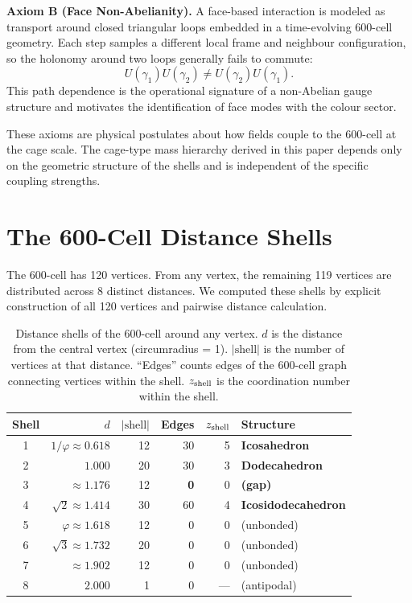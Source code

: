 \documentclass[11pt,letterpaper]{article}
\newcommand{\phig}{\varphi}
\begin{document}
\medskip

\textbf{Axiom B (Face Non-Abelianity).}
A face-based interaction is modeled as transport around closed
triangular loops embedded in a time-evolving 600-cell geometry.
Each step samples a different local frame and neighbour
configuration, so the holonomy around two loops generally fails to
commute:
\begin{equation}
U(\gamma_1)U(\gamma_2)\neq U(\gamma_2)U(\gamma_1).
\end{equation}
This path dependence is the operational signature of a non-Abelian
gauge structure and motivates the identification of face modes with
the colour sector.

\medskip

These axioms are physical postulates about how fields couple to
the 600-cell at the cage scale.  The cage-type mass hierarchy
derived in this paper depends only on the geometric structure of
the shells and is independent of the specific coupling strengths.

\section{The 600-Cell Distance Shells}
\label{sec:shells}

The 600-cell has 120 vertices.  From any vertex, the remaining 119
vertices are distributed across 8 distinct distances.  We computed
these shells by explicit construction of all 120 vertices and
pairwise distance calculation.

\begin{table}[H]
\centering
\caption{Distance shells of the 600-cell around any vertex.
  $d$ is the distance from the central vertex (circumradius = 1).
  $|\text{shell}|$ is the number of vertices at that distance.
  ``Edges'' counts edges of the 600-cell graph connecting
  vertices within the shell.  $z_{\rm shell}$ is the coordination
  number within the shell.}
\label{tab:shells}
\begin{tabular}{@{}crrrrl@{}}
\toprule
Shell & $d$ & $|\text{shell}|$ & Edges & $z_{\rm shell}$ & Structure \\
\midrule
1 & $1/\phig \approx 0.618$ & 12 & 30 & 5 & \textbf{Icosahedron} \\
2 & $1.000$ & 20 & 30 & 3 & \textbf{Dodecahedron} \\
3 & $\approx 1.176$ & 12 & \textbf{0} & 0 & \textbf{(gap)} \\
4 & $\sqrt{2} \approx 1.414$ & 30 & 60 & 4 & \textbf{Icosidodecahedron} \\
5 & $\phig \approx 1.618$ & 12 & 0 & 0 & (unbonded) \\
6 & $\sqrt{3} \approx 1.732$ & 20 & 0 & 0 & (unbonded) \\
7 & $\approx 1.902$ & 12 & 0 & 0 & (unbonded) \\
8 & $2.000$ & 1 & 0 & --- & (antipodal) \\
\bottomrule
\end{tabular}
\end{table}
\end{document}
